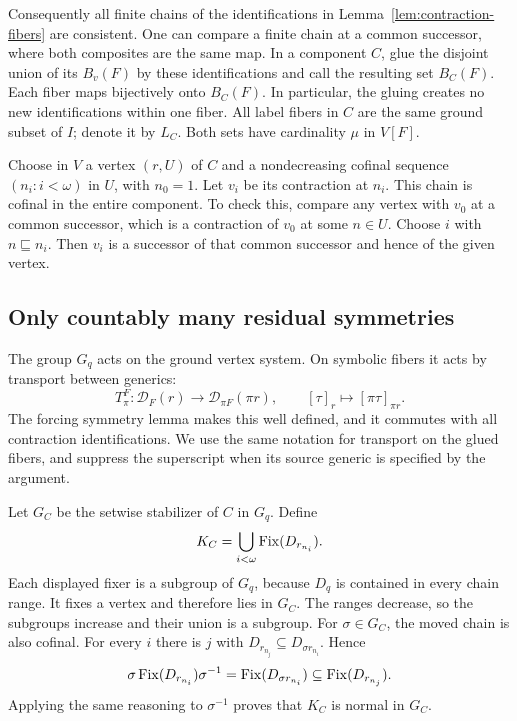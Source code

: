 Consequently all finite chains of the identifications in
Lemma~\ref{lem:contraction-fibers} are consistent. One can compare a
finite chain at a common successor, where both composites are the
same map. In a component $C$, glue the disjoint union of its $B_v(F)$
by these identifications and call the resulting set $B_C(F)$. Each
fiber maps bijectively onto $B_C(F)$. In particular, the gluing creates
no new identifications within one fiber. All label fibers in $C$
are the same ground subset of $I$; denote it by $L_C$. Both sets have
cardinality $\mu$ in $V[F]$.

Choose in $V$ a vertex $(r,U)$ of $C$ and a nondecreasing cofinal
sequence $(n_i:i<\omega)$ in $U$, with $n_0=1$. Let $v_i$ be its
contraction at $n_i$. This chain is cofinal in the entire component.
To check this, compare any vertex with $v_0$ at a common successor,
which is a contraction of $v_0$ at some $n\in U$. Choose $i$ with
$n\sqsubseteq n_i$. Then $v_i$ is a successor of that common
successor and hence of the given vertex.

\subsection{Only countably many residual symmetries}

The group $G_q$ acts on the ground vertex system. On symbolic fibers
it acts by transport between generics:
\begin{equation}\label{eq:symbolic-transport}
 T_\pi^F:\mathcal D_F(r)\longrightarrow
                   \mathcal D_{\pi F}(\pi r),
 \qquad [\tau]_r\longmapsto[\pi\tau]_{\pi r}.
\end{equation}
The forcing symmetry lemma makes this well defined, and it commutes
with all contraction identifications. We use the same notation for
transport on the glued fibers, and suppress the superscript when its
source generic is specified by the argument.

Let $G_C$ be the setwise stabilizer of $C$ in $G_q$. Define
\[
 K_C=\bigcup_{i<\omega}\operatorname{Fix}(D_{r_{n_i}}).
\]
Each displayed fixer is a subgroup of $G_q$, because $D_q$ is contained
in every chain range. It fixes a vertex and therefore lies in $G_C$.
The ranges decrease, so the subgroups increase and their union is a
subgroup. For $\sigma\in G_C$, the moved chain is also cofinal.
For every $i$ there is $j$ with
$D_{r_{n_j}}\subseteq D_{\sigma r_{n_i}}$. Hence
\[
 \sigma\operatorname{Fix}(D_{r_{n_i}})\sigma^{-1}
 =\operatorname{Fix}(D_{\sigma r_{n_i}})\subseteq\operatorname{Fix}(D_{r_{n_j}}).
\]
Applying the same reasoning to $\sigma^{-1}$ proves that $K_C$ is
normal in $G_C$.

